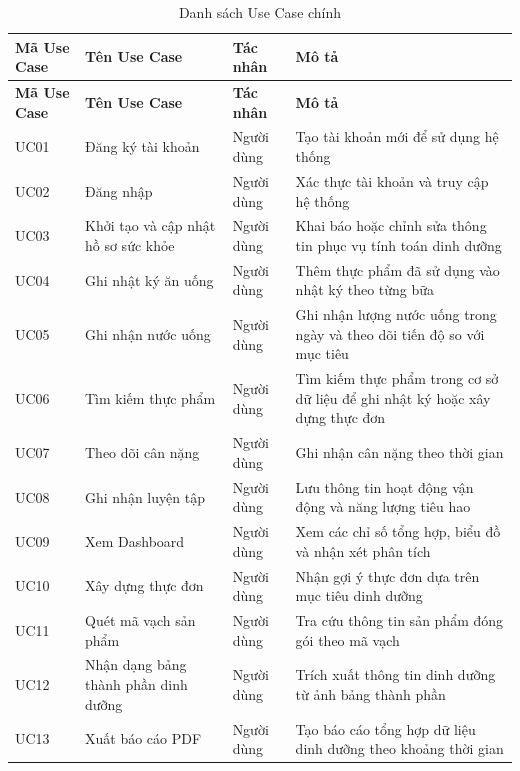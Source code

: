 \documentclass[12pt, a4paper]{report}
\begin{document}
\begin{longtable}{|>{\raggedright\arraybackslash}p{3cm}|>{\raggedright\arraybackslash}p{3cm}|>{\raggedright\arraybackslash}p{4cm}|>{\raggedright\arraybackslash}p{5cm}|}
\caption{Danh sách Use Case chính}
\label{tab:danh_sach_usecase} \\
\hline
\textbf{Mã Use Case} & \textbf{Tên Use Case} & \textbf{Tác nhân} & \textbf{Mô tả} \\
\hline
\endfirsthead
\hline
\textbf{Mã Use Case} & \textbf{Tên Use Case} & \textbf{Tác nhân} & \textbf{Mô tả} \\
\hline
\endhead

UC01 & Đăng ký tài khoản & Người dùng & Tạo tài khoản mới để sử dụng hệ thống \\
\hline
UC02 & Đăng nhập & Người dùng & Xác thực tài khoản và truy cập hệ thống \\
\hline
UC03 & Khởi tạo và cập nhật hồ sơ sức khỏe & Người dùng & Khai báo hoặc chỉnh sửa thông tin phục vụ tính toán dinh dưỡng \\
\hline
UC04 & Ghi nhật ký ăn uống & Người dùng & Thêm thực phẩm đã sử dụng vào nhật ký theo từng bữa \\
\hline
UC05 & Ghi nhận nước uống & Người dùng & Ghi nhận lượng nước uống trong ngày và theo dõi tiến độ so với mục tiêu \\
\hline
UC06 & Tìm kiếm thực phẩm & Người dùng & Tìm kiếm thực phẩm trong cơ sở dữ liệu để ghi nhật ký hoặc xây dựng thực đơn \\
\hline
UC07 & Theo dõi cân nặng & Người dùng & Ghi nhận cân nặng theo thời gian \\
\hline
UC08 & Ghi nhận luyện tập & Người dùng & Lưu thông tin hoạt động vận động và năng lượng tiêu hao \\
\hline
UC09 & Xem Dashboard & Người dùng & Xem các chỉ số tổng hợp, biểu đồ và nhận xét phân tích \\
\hline
UC10 & Xây dựng thực đơn & Người dùng & Nhận gợi ý thực đơn dựa trên mục tiêu dinh dưỡng \\
\hline
UC11 & Quét mã vạch sản phẩm & Người dùng & Tra cứu thông tin sản phẩm đóng gói theo mã vạch \\
\hline
UC12 & Nhận dạng bảng thành phần dinh dưỡng & Người dùng & Trích xuất thông tin dinh dưỡng từ ảnh bảng thành phần \\
\hline
UC13 & Xuất báo cáo PDF & Người dùng & Tạo báo cáo tổng hợp dữ liệu dinh dưỡng theo khoảng thời gian \\
\hline
\end{longtable}
\end{document}
